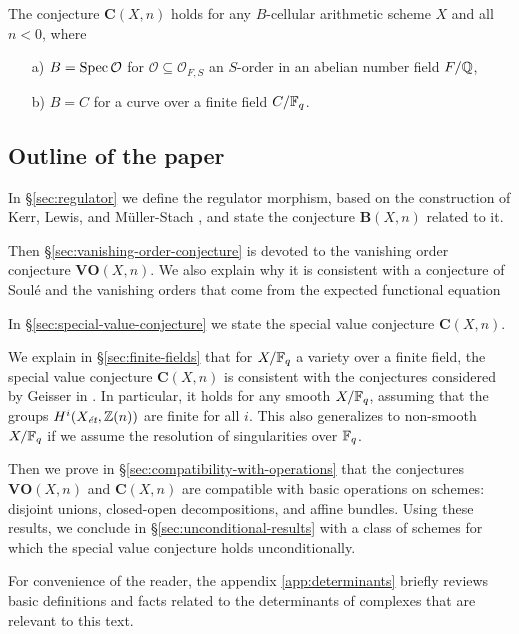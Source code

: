 \documentclass{article}
\numberwithin{equation}{section}
\begin{document}
\begin{maintheorem*}
  The conjecture $\mathbf{C} (X,n)$ holds for any $B$-cellular arithmetic scheme
  $X$ and all $n < 0$, where
  \begin{enumerate}
  \item[a)] $B = \Spec \mathcal{O}$ for
    $\mathcal{O} \subseteq \mathcal{O}_{F,S}$ an $S$-order in an abelian number
    field $F/\QQ$,

  \item[b)] $B = C$ for a curve over a finite field $C/\FF_q$.
  \end{enumerate}
\end{maintheorem*}

\subsection*{Outline of the paper}

In \S\ref{sec:regulator} we define the regulator morphism, based on the
construction of Kerr, Lewis, and Müller-Stach
\cite{Kerr-Lewis-Muller-Stach-2006}, and state the conjecture $\mathbf{B} (X,n)$
related to it.

Then \S\ref{sec:vanishing-order-conjecture} is devoted to the vanishing order
conjecture $\mathbf{VO} (X,n)$. We also explain why it is consistent with a
conjecture of Soulé and the vanishing orders that come from the expected
functional equation

In \S\ref{sec:special-value-conjecture} we state the special value conjecture
$\mathbf{C} (X,n)$.

We explain in \S\ref{sec:finite-fields} that for $X/\FF_q$ a variety
over a finite field, the special value conjecture $\mathbf{C} (X,n)$ is
consistent with the conjectures considered by Geisser in
\cite{Geisser-2004,Geisser-2006,Geisser-2010-arithmetic-homology}.
In particular, it holds for any smooth $X/\FF_q$, assuming that the groups
$H^i (X_\et, \ZZ (n))$ are finite for all $i$. This also generalizes to
non-smooth $X/\FF_q$ if we assume the resolution of singularities over $\FF_q$.

Then we prove in \S\ref{sec:compatibility-with-operations} that the conjectures
$\mathbf{VO} (X,n)$ and $\mathbf{C} (X,n)$ are compatible with basic operations
on schemes: disjoint unions, closed-open decompositions, and affine
bundles. Using these results, we conclude in \S\ref{sec:unconditional-results}
with a class of schemes for which the special value conjecture holds
unconditionally.

For convenience of the reader, the appendix \ref{app:determinants} briefly
reviews basic definitions and facts related to the determinants of complexes
that are relevant to this text.
\end{document}
